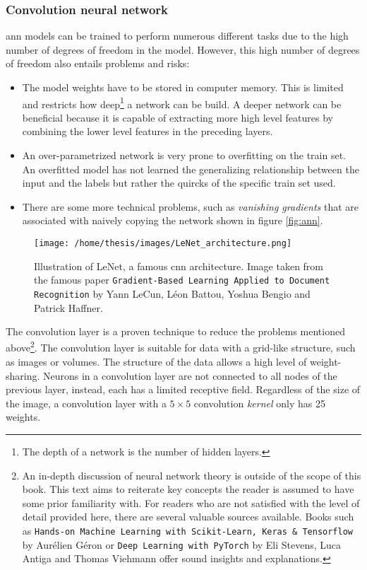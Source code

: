 \subsubsection{Convolution neural network}

\acrshort{ann} models can be trained to perform numerous different tasks due to the high number of degrees of freedom in the model.
However, this high number of degrees of freedom also entails problems and risks:

\begin{itemize}
    \item The model weights have to be stored in computer memory. 
    This is limited and restricts how deep\footnote{The depth of a network is the number of hidden layers.} a network can be build.
    A deeper network can be beneficial because it is capable of extracting more high level features by combining the lower level features in the preceding layers. 
    \item An over-parametrized network is very prone to overfitting on the train set. 
    An overfitted model has not learned the generalizing relationship between the input and the labels but rather the quircks of the specific train set used.
    \item There are some more technical problems, such as \textit{vanishing gradients} that are associated with naively copying the network shown in figure \ref{fig:ann}. 
\end{itemize}
\begin{SCfigure}[][h!]
    \centering
    \texttt{[image: /home/thesis/images/LeNet\_architecture.png]}
    \caption{
        Illustration of LeNet, a famous \Gls{cnn} architecture.
        Image taken from the famous paper \texttt{Gradient-Based Learning Applied to Document Recognition} by Yann LeCun, Léon Battou, Yoshua Bengio and Patrick Haffner. \label{fig:LeNet}
        }
\end{SCfigure}
\par{
    The convolution layer is a proven technique to reduce the problems mentioned above\footnote{
        An in-depth discussion of neural network theory is outside of the scope of this book.
        This text aims to reiterate key concepts the reader is assumed to have some prior familiarity with.
        For readers who are not satisfied with the level of detail provided here, there are several valuable sources available.
        Books such as \texttt{Hands-on Machine Learning with Scikit-Learn, Keras \& Tensorflow} by Aurélien Géron or \texttt{Deep Learning with PyTorch} by Eli Stevens, Luca Antiga and Thomas Viehmann offer sound insights and explanations.
    }.
    The convolution layer is suitable for data with a grid-like structure, such as images or volumes.
    The structure of the data allows a high level of weight-sharing. 
    Neurons in a convolution layer are not connected to all nodes of the previous layer, instead, each has a limited receptive field.
    Regardless of the size of the image, a convolution layer with a $5\times 5$ convolution \textit{kernel} only has 25 weights.
}
